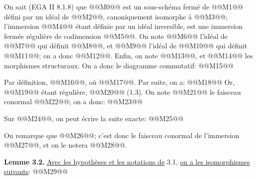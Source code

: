 
On sait (EGA II 8.1.8) que @@M0@@ est un sous-schéma fermé de @@M1@@ défini par un idéal de @@M2@@, canoniquement isomorphe à @@M3@@; l'immersion @@M4@@ étant définie par un idéal inversible, est une immersion fermée régulière de codimension @@M5@@. On note @@M6@@ l'idéal de @@M7@@ qui définit @@M8@@, et @@M9@@ l'idéal de @@M10@@ qui définit @@M11@@; on a donc @@M12@@. Enfin, on note @@M13@@, et @@M14@@ les morphismes structuraux. On a donc le diagramme commutatif:
@@M15@@

Par définition, @@M16@@, où @@M17@@. Par suite, on a:
@@M18@@
Or, @@M19@@ étant régulière, @@M20@@ (1.3). On note @@M21@@ le faisceau conormal @@M22@@; on a donc:
@@M23@@

Sur @@M24@@, on peut écrire la suite exacte:
@@M25@@

On remarque que @@M26@@; c'est donc le faisceau conormal de l'immersion @@M27@@, et on le notera @@M28@@.

\textbf{Lemme 3.2.} \uline{Avec les hypothèses et les notations de} 3.1, \uline{on a les isomorphismes suivants}:
@@M29@@



